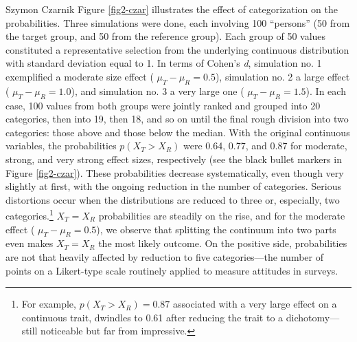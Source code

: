 \begin{artengenv}{Szymon Czarnik}
Figure \ref{fig2-czar} illustrates the effect of categorization on the probabilities. Three simulations were done, each involving 100 ``persons'' (50 from the target group, and 50 from the reference group). Each group of 50 values constituted a representative selection from the underlying continuous distribution with standard deviation equal to 1. In terms of Cohen's \textit{d}, simulation no. 1 exemplified a moderate size effect ( $\mu _T-\mu _R=0.5$), simulation no. 2 a large effect ( $\mu _T-\mu _R=1.0$), and simulation no. 3 a very large one ( $\mu _T-\mu _R=1.5$). In each case, 100 values from both groups were jointly ranked and grouped into 20 categories, then into 19, then 18, and so on until the final rough division into two categories: those above and those below the median. With the original continuous variables, the probabilities $p\left(X_T>X_R\right)$ were 0.64, 0.77, and 0.87 for moderate, strong, and very strong effect sizes, respectively (see the black bullet markers in Figure \ref{fig2-czar}). These probabilities decrease systematically, even though very slightly at first, with the ongoing reduction in the number of categories. Serious distortions occur when the distributions are reduced to three or, especially, two categories.\footnote{For example, $p\left(X_T>X_R\right)=0.87$ associated with a very large effect on a continuous trait, dwindles to 0.61 after reducing the trait to a dichotomy—still noticeable but far from impressive.} $X_T=X_R$ probabilities are steadily on the rise, and for the moderate effect ( $\mu _T-\mu _R=0.5$), we observe that splitting the continuum into two parts even makes $X_T=X_R$ the most likely outcome. On the positive side, probabilities are not that heavily affected by reduction to five categories—the number of points on a Likert-type scale routinely applied to measure attitudes in surveys.



\end{artengenv}
